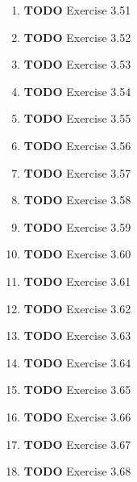 \documentclass[11pt]{article}
\begin{document}
\begin{enumerate}
\begin{enumerate}
\item {\bfseries\sffamily TODO} Exercise 3.51
\label{sec:org184f198}

\item {\bfseries\sffamily TODO} Exercise 3.52
\label{sec:org21fdee5}

\item {\bfseries\sffamily TODO} Exercise 3.53
\label{sec:orgb642375}

\item {\bfseries\sffamily TODO} Exercise 3.54
\label{sec:orgc578b8e}

\item {\bfseries\sffamily TODO} Exercise 3.55
\label{sec:orgb449d2c}

\item {\bfseries\sffamily TODO} Exercise 3.56
\label{sec:orgff3b33c}

\item {\bfseries\sffamily TODO} Exercise 3.57
\label{sec:org4ed01a6}

\item {\bfseries\sffamily TODO} Exercise 3.58
\label{sec:orgd7a5cef}

\item {\bfseries\sffamily TODO} Exercise 3.59
\label{sec:org04daf85}

\item {\bfseries\sffamily TODO} Exercise 3.60
\label{sec:orgd59688f}

\item {\bfseries\sffamily TODO} Exercise 3.61
\label{sec:orgd446517}

\item {\bfseries\sffamily TODO} Exercise 3.62
\label{sec:org5c4c3f5}

\item {\bfseries\sffamily TODO} Exercise 3.63
\label{sec:orgb45693a}

\item {\bfseries\sffamily TODO} Exercise 3.64
\label{sec:org442824a}

\item {\bfseries\sffamily TODO} Exercise 3.65
\label{sec:org396aec3}

\item {\bfseries\sffamily TODO} Exercise 3.66
\label{sec:org08ef9f4}

\item {\bfseries\sffamily TODO} Exercise 3.67
\label{sec:orgc64b417}

\item {\bfseries\sffamily TODO} Exercise 3.68
\label{sec:orga6543b3}


\end{enumerate}
\end{enumerate}
\end{document}
